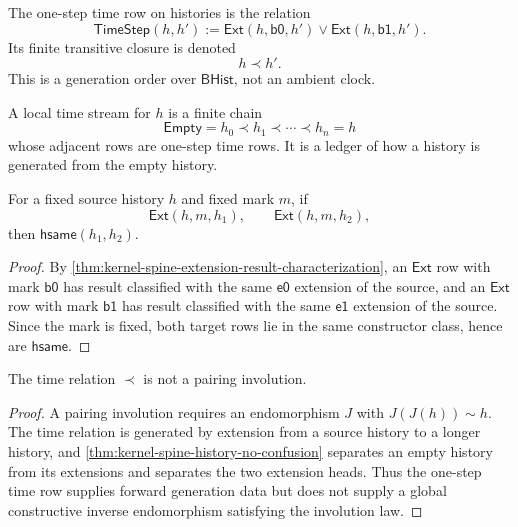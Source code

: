 \begin{definition}
\label{def:omega-generation-one-step-time-row}
The one-step time row on histories is the relation
$$
\mathsf{TimeStep}(h,h')
:=
\mathsf{Ext}(h,\mathsf{b0},h')
\vee
\mathsf{Ext}(h,\mathsf{b1},h').
$$
Its finite transitive closure is denoted
$$
h\prec h'.
$$
This is a generation order over $\mathsf{BHist}$, not an ambient clock.
\end{definition}

\begin{definition}
\label{def:omega-generation-local-time-stream}
A local time stream for $h$ is a finite chain
$$
\mathsf{Empty}=h_0\prec h_1\prec\cdots\prec h_n=h
$$
whose adjacent rows are one-step time rows. It is a ledger of how a
history is generated from the empty history.
\end{definition}

\begin{theorem}
\label{thm:omega-generation-time-forward-determinacy}
For a fixed source history $h$ and fixed mark $m$, if
$$
\mathsf{Ext}(h,m,h_1),
\qquad
\mathsf{Ext}(h,m,h_2),
$$
then $\mathsf{hsame}(h_1,h_2)$.
\end{theorem}

\begin{proof}
By \autoref{thm:kernel-spine-extension-result-characterization}, an
$\mathsf{Ext}$ row with mark $\mathsf{b0}$ has result classified with the
same $\mathsf{e0}$ extension of the source, and an $\mathsf{Ext}$ row with
mark $\mathsf{b1}$ has result classified with the same $\mathsf{e1}$
extension of the source. Since the mark is fixed, both target rows lie in
the same constructor class, hence are $\mathsf{hsame}$.
\end{proof}

\begin{theorem}
\label{thm:omega-generation-time-not-pairing}
The time relation $\prec$ is not a pairing involution.
\end{theorem}

\begin{proof}
A pairing involution requires an endomorphism $J$ with
$J(J(h))\sim h$. The time relation is generated by extension from a source
history to a longer history, and
\autoref{thm:kernel-spine-history-no-confusion} separates an empty history
from its extensions and separates the two extension heads. Thus the
one-step time row supplies forward generation data but does not supply a
global constructive inverse endomorphism satisfying the involution law.
\end{proof}

